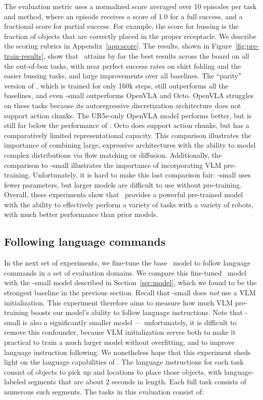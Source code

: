 The evaluation metric uses a normalized score averaged over 10 episodes per task and method, where an episode receives a score of 1.0 for a full success, and a fractional score for partial success. For example, the score for bussing is the fraction of objects that are correctly placed in the proper receptacle. We describe the scoring rubrics in Appendix~\ref{app:score}. The results, shown in Figure~\ref{fig:pre-train-results}, show that \ModelSymbol\ attains by far the best results across the board on all the out-of-box tasks, with near perfect success rates on shirt folding and the easier bussing tasks, and large improvements over all baselines. The ``parity'' version of \ModelSymbol, which is trained for only 160k steps, still outperforms all the baselines, and even \ModelSymbol-small outperforms OpenVLA and Octo. OpenVLA struggles on these tasks because its autoregressive discretization architecture does not support action chunks. The UR5e-only OpenVLA model performs better, but is still far below the performance of \ModelSymbol. Octo does support action chunks, but has a comparatively limited representational capacity. This comparison illustrates the importance of combining large, expressive architectures with the ability to model complex distributions via flow matching or diffusion. Additionally, the comparison to \ModelSymbol-small illustrates the importance of incorporating VLM pre-training. Unfortunately, it is hard to make this last comparison fair: \ModelSymbol-small uses fewer parameters, but larger models are difficult to use without pre-training. Overall, these experiments show that \ModelSymbol\ provides a powerful pre-trained model with the ability to effectively perform a variety of tasks with a variety of robots, with much better performance than prior models.

\subsection{Following language commands}

In the next set of experiments, we fine-tune the base \ModelSymbol\ model to follow language commands in a set of evaluation domains. We compare this fine-tuned \ModelSymbol\ model with the \ModelSymbol-small model described in Section~\ref{sec:model}, which we found to be the strongest baseline in the previous section. Recall that \ModelSymbol-small does \emph{not} use a VLM initialization. This experiment therefore aims to measure how much VLM pre-training boosts our model's ability to follow language instructions. Note that \ModelSymbol-small is also a significantly smaller model --- unfortunately, it is difficult to remove this confounder, because VLM initialization serves both to make it practical to train a much larger model without overfitting, and to improve language instruction following. We nonetheless hope that this experiment sheds light on the language capabilities of \ModelSymbol. The language instructions for each task consist of objects to pick up and locations to place those objects, with language-labeled segments that are about 2 seconds in length. Each full task consists of numerous such segments. The tasks in this evaluation consist of:

